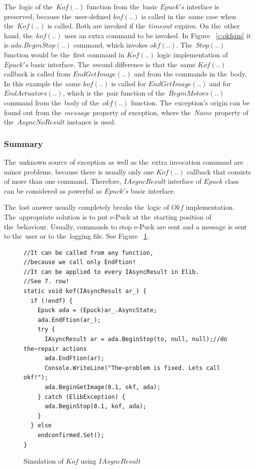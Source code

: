   The~logic of the~$Kof(..)$ function from the~basic $Epuck's$ interface is preserved, because the~user-defined
  $kof(..)$ is called in the~same case when the~$Kof(..)$ is called. Both are invoked if the~$timeout$ expires.
  On the~other hand, the~$kof(..)$ uses an extra command to be invoked. In Figure ~\ref{c:okfsim} it
  is $ada.BeginStop(..)$ command, which invokes $okf(..)$. The~$Stop(..)$ function would be the~first command
  in $Kof(..)$ logic implementation of $Epuck's$ basic interface.
  The~second difference is that the~same $Kof(..)$ callback is called from $EndGetImage(..)$ and from the
  commands in the~body. In this example the~same $kof(..)$ is called for $EndGetImage(..)$ and 
  for $EndActuators(..)$, which is the~pair function of the~$BeginMotors(..)$ 
  command from the~body of the~$okf(..)$ function.
  The~exception's origin can be found out from the~$message$ property of exception, 
  where the~$Name$ property of the~$AsyncNoResult$ instance is used.

  \subsubsection*{Summary} %
  The~unknown source of exception as well as the~extra invocation command are minor problems, because
  there is usually only one $Kof(..)$ callback that consists of more than one command. 
  Therefore, $IAsyncResult$ interface of $Epuck$ class can be considered as powerful as $Epuck's$ basic interface.

  \begin{remark}
  The~lost answer usually completely breaks the~logic of $Okf$ implementation.
  The~appropriate solution is to put e-Puck
  at the~starting position of the~behaviour. Usually, commands to stop e-Puck are sent 
  and a message is sent to the~user or to the~logging file.
  See Figure ~\ref{iasynckof}.
  \end{remark}

\begin{figure}[!hbp]
\begin{lstlisting}
//It can be called from any function,
//because we call only EndFtion!
//It can be applied to every IAsyncResult in Elib.
//See 7. row!
static void kof(IAsyncResult ar_) {
  if (!endf) {
    Epuck ada = (Epuck)ar_.AsyncState;
    ada.EndFtion(ar_);
    try {
      IAsyncResult ar = ada.BeginStop(to, null, null);//do the~repair actions
      ada.EndFtion(ar);
      Console.WriteLine("The~problem is fixed. Lets call okf!");
      ada.BeginGetImage(0.1, okf, ada);
    } catch (ElibException) {
      ada.BeginStop(0.1, kof, ada);
    }
  } else
    endconfirmed.Set();
}
\end{lstlisting}
\caption{Simulation of $Kof$ using $IAsyncResult$}
\label{iasynckof}
\end{figure}

